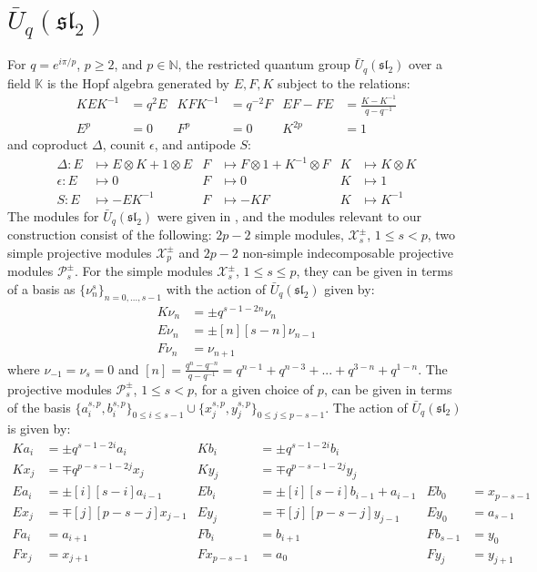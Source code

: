 \documentclass[]{article}
\begin{document}
\section{$\bar{U}_{q}(\mathfrak{sl}_{2})$ \label{Uq}}
For $q=e^{i\pi/p}$, $p\geq 2$, and $p\in \mathbb{N}$, the restricted quantum group $\bar{U}_{q}(\mathfrak{sl}_{2})$ over a field $\mathbb{K}$ is the Hopf algebra generated by $E,F,K$ subject to the relations:
\begin{align*}
KEK^{-1}&=q^{2}E& KFK^{-1}&=q^{-2}F& EF-FE&=\frac{K-K^{-1}}{q-q^{-1}}\\
E^{p}&=0& F^{p}&=0& K^{2p}&=1
\end{align*}
and coproduct $\Delta$, counit $\epsilon$, and antipode $S$:
\begin{align*}
\Delta:E&\mapsto E\otimes K+1\otimes E& F&\mapsto F\otimes 1+K^{-1}\otimes F& K&\mapsto K\otimes K\\
\epsilon:E&\mapsto 0& F&\mapsto 0& K&\mapsto 1\\
S:E&\mapsto-EK^{-1}& F&\mapsto-KF& K&\mapsto K^{-1}
\end{align*}
The modules for $\bar{U}_{q}(\mathfrak{sl}_{2})$ were given in \cite{Arike,GST,KoSa,Suter,Xiao}, and the modules relevant to our construction consist of the following:
$2p-2$ simple modules, $\mathcal{X}^{\pm}_{s}$, $1\leq s<p$, two simple projective modules $\mathcal{X}^{\pm}_{p}$ and $2p-2$ non-simple indecomposable projective modules $\mathcal{P}^{\pm}_{s}$. For the simple modules $\mathcal{X}^{\pm}_{s}$, $1\leq s\leq p$, they can be given in terms of a basis as $\{\nu_{n}^{s}\}_{n=0,...,s-1}$ with the action of $\bar{U}_{q}(\mathfrak{sl}_{2})$ given by:
\begin{align*}
K\nu_{n}&=\pm q^{s-1-2n}\nu_{n}\\
E\nu_{n}&=\pm[n][s-n]\nu_{n-1}\\
F\nu_{n}&=\nu_{n+1}
\end{align*}
where $\nu_{-1}=\nu_{s}=0$ and $[n]=\frac{q^{n}-q^{-n}}{q-q^{-1}}=q^{n-1}+q^{n-3}+...+q^{3-n}+q^{1-n}$. The projective modules $\mathcal{P}^{\pm}_{s}$, $1\leq s<p$, for a given choice of $p$, can be given in terms of the basis $\{a_{i}^{s,p},b_{i}^{s,p}\}_{0\leq i \leq s-1}\cup\{x_{j}^{s,p},y_{j}^{s,p}\}_{0\leq j\leq p-s-1}$. The action of $\bar{U}_{q}(\mathfrak{sl}_{2})$ is given by:
\begin{align*}
Ka_{i}&=\pm q^{s-1-2i}a_{i}& Kb_{i}&=\pm q^{s-1-2i}b_{i}\\
Kx_{j}&=\mp q^{p-s-1-2j}x_{j}& Ky_{j}&=\mp q^{p-s-1-2j}y_{j}\\
Ea_{i}&=\pm[i][s-i]a_{i-1}& Eb_{i}&=\pm[i][s-i]b_{i-1}+a_{i-1}& Eb_{0}&=x_{p-s-1}\\
Ex_{j}&=\mp[j][p-s-j]x_{j-1}& Ey_{j}&=\mp[j][p-s-j]y_{j-1}& Ey_{0}&=a_{s-1}\\
Fa_{i}&=a_{i+1}& Fb_{i}&=b_{i+1}& Fb_{s-1}&=y_{0}\\
Fx_{j}&=x_{j+1}& Fx_{p-s-1}&=a_{0}& Fy_{j}&=y_{j+1}
\end{align*}
\end{document}
